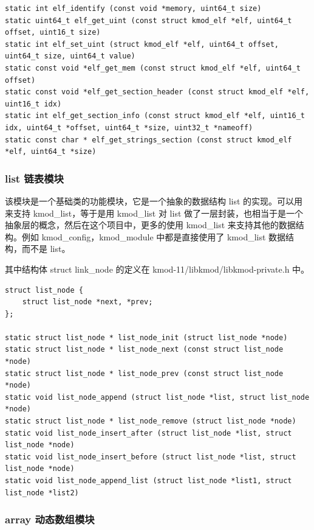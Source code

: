 \documentclass[11pt,a4paper]{article}
\begin{document}
{\begin{shaded}\begin{verbatim}
static int elf_identify (const void *memory, uint64_t size)
static uint64_t elf_get_uint (const struct kmod_elf *elf, uint64_t offset, uint16_t size)
static int elf_set_uint (struct kmod_elf *elf, uint64_t offset, uint64_t size, uint64_t value)
static const void *elf_get_mem (const struct kmod_elf *elf, uint64_t offset)
static const void *elf_get_section_header (const struct kmod_elf *elf, uint16_t idx)
static int elf_get_section_info (const struct kmod_elf *elf, uint16_t idx, uint64_t *offset, uint64_t *size, uint32_t *nameoff)
static const char * elf_get_strings_section (const struct kmod_elf *elf, uint64_t *size)
\end{verbatim}\end{shaded}}
\subsubsection{list 链表模块}

该模块是一个基础类的功能模块，它是一个抽象的数据结构 list
的实现。可以用来支持 kmod\_list，等于是用 kmod\_list 对 list
做了一层封装，也相当于是一个抽象层的概念，然后在这个项目中，更多的使用
kmod\_list 来支持其他的数据结构。例如 kmod\_config，kmod\_module
中都是直接使用了 kmod\_list 数据结构，而不是 list。

其中结构体 struct link\_node 的定义在 kmod-11/libkmod/libkmod-private.h
中。

{\begin{shaded}\begin{verbatim}
struct list_node {
    struct list_node *next, *prev;
};

static struct list_node * list_node_init (struct list_node *node)
static struct list_node * list_node_next (const struct list_node *node)
static struct list_node * list_node_prev (const struct list_node *node)
static void list_node_append (struct list_node *list, struct list_node *node)
static struct list_node * list_node_remove (struct list_node *node)
static void list_node_insert_after (struct list_node *list, struct list_node *node)
static void list_node_insert_before (struct list_node *list, struct list_node *node)
static void list_node_append_list (struct list_node *list1, struct list_node *list2)
\end{verbatim}\end{shaded}}
\subsubsection{array 动态数组模块}
\end{document}

